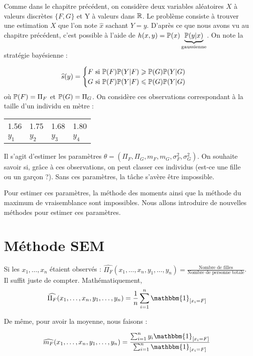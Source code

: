 Comme dans le chapitre précédent, on considère deux variables aléatoires $X$ à valeurs discrètes $\{F, G \}$ et Y à valeurs dans $\R$. Le problème consiste à trouver une estimation $X$ que l'on note $\widehat{x}$ sachant $Y=y$. D'après ce que nous avons vu au chapitre précédent, c'est possible à l'aide de $h(x,y) = \P(x)\underbrace{\P(y \vert x)}_\text{gaussienne}$. On note la stratégie bayésienne :

\[\widehat{s}(y) = 
  \begin{cases}
    F \text{ si } \P(F)\P(Y \vert F) \geq \P(G) \P(Y \vert G ) \\
    G \text{ si } \P(F)\P(Y \vert F) \leq \P(G) \P(Y \vert G )
  \end{cases}
\]
où $\P(F) = \Pi_F$ et $\P(G) = \Pi_G$. On considère ces observations correspondant à la taille d'un individu en mètre :
\begin{center}
\begin{tabular}{llll}
  1.56 & 1.75 & 1.68 & 1.80 \\
$y_1$ & $y_2$ & $y_3$ & $y_4$
\end{tabular}

\end{center}

Il s'agit d'estimer les paramètres $\theta = (\Pi_F, \Pi_G, m_F, m_G, \sigma^2_F, \sigma^2_G)$. On souhaite savoir si, grâce à ces observations, on peut classer ces individus (est-ce une fille ou un garçon ?). Sans ces paramètres, la tâche s'avère être impossible.

Pour estimer ces paramètres, la méthode des moments ainsi que la méthode du maximum de vraisemblance sont impossibles. Nous allons introduire de nouvelles méthodes pour estimer ces paramètres.

\section{Méthode SEM}
Si les $x_1,\ldots,x_n$ étaient observés : $\widehat{\Pi_F}(x_1,\ldots,x_n,y_1,\ldots,y_n) = \frac{ \text{Nombre de filles}}{\text{Nombre de personne totale}}$. Il suffit juste de compter. Mathématiquement, 
\[ \widehat{\Pi_F}(x_1,\ldots,x_n,y_1,\ldots,y_n) = \frac{1}{n} \sum_{i=1}^{n} \mathbbm{1}_{[x_i=F]} \]

De même, pour avoir la moyenne, nous faisons :

\[ \widehat{m_F}(x_1,\ldots,x_n,y_1,\ldots,y_n) = \frac{\sum_{i=1}^{n} y_i\mathbbm{1}_{[x_i=F]}}{\sum_{i=1}^n \mathbbm{1}_{[x_i = F]}} \]

